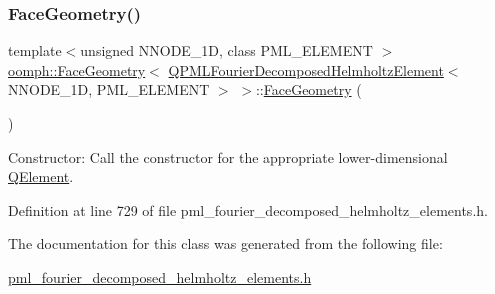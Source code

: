 \subsubsection{\texorpdfstring{Face\+Geometry()}{FaceGeometry()}}
{\footnotesize\ttfamily template$<$unsigned N\+N\+O\+D\+E\+\_\+1D, class P\+M\+L\+\_\+\+E\+L\+E\+M\+E\+NT $>$ \\
\hyperlink{classoomph_1_1FaceGeometry}{oomph\+::\+Face\+Geometry}$<$ \hyperlink{classoomph_1_1QPMLFourierDecomposedHelmholtzElement}{Q\+P\+M\+L\+Fourier\+Decomposed\+Helmholtz\+Element}$<$ N\+N\+O\+D\+E\+\_\+1D, P\+M\+L\+\_\+\+E\+L\+E\+M\+E\+NT $>$ $>$\+::\hyperlink{classoomph_1_1FaceGeometry}{Face\+Geometry} (\begin{DoxyParamCaption}{ }\end{DoxyParamCaption})\hspace{0.3cm}{\ttfamily [inline]}}



Constructor\+: Call the constructor for the appropriate lower-\/dimensional \hyperlink{classoomph_1_1QElement}{Q\+Element}. 



Definition at line 729 of file pml\+\_\+fourier\+\_\+decomposed\+\_\+helmholtz\+\_\+elements.\+h.



The documentation for this class was generated from the following file\+:\begin{DoxyCompactItemize}
\item 
\hyperlink{pml__fourier__decomposed__helmholtz__elements_8h}{pml\+\_\+fourier\+\_\+decomposed\+\_\+helmholtz\+\_\+elements.\+h}\end{DoxyCompactItemize}
